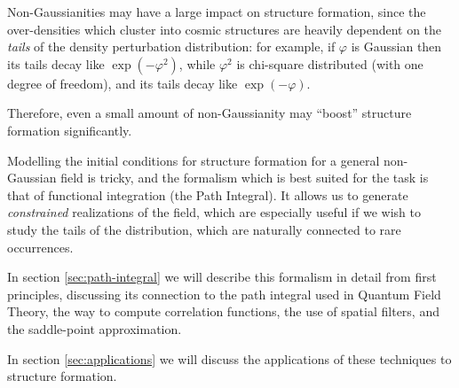 \documentclass[main.tex]{subfiles}
\begin{document}
Non-Gaussianities may have a large impact on structure formation, since the over-densities which cluster into cosmic structures are heavily dependent on the \emph{tails} of the density perturbation distribution: for example, if \(\varphi \) is Gaussian then its tails decay like \(\exp(- \varphi^2)\), while \(\varphi^2\) is chi-square distributed (with one degree of freedom), and its tails decay like \(\exp(- \varphi )\).

Therefore, even a small amount of non-Gaussianity may ``boost'' structure formation significantly.

Modelling the initial conditions for structure formation for a general non-Gaussian field is tricky, and the formalism which is best suited for the task is that of functional integration (the Path Integral). 
It allows us to generate \emph{constrained} realizations of the field, which are especially useful if we wish to study the tails of the distribution, which are naturally connected to rare occurrences. 

In section \ref{sec:path-integral} we will describe this formalism in detail from first principles, discussing its connection to the path integral used in Quantum Field Theory, the way to compute correlation functions, the use of spatial filters, and the saddle-point approximation. 

In section \ref{sec:applications} we will discuss the applications of these techniques to structure formation. 
\end{document}
